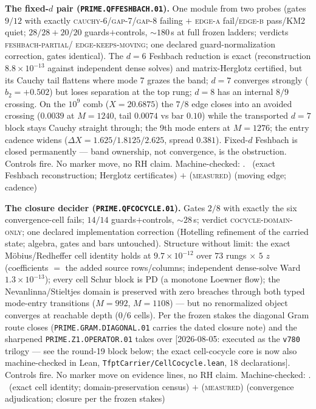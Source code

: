 \documentclass[11pt,a4paper]{article}
\theoremstyle{definition}
\begin{document}
\par\smallskip\noindent\textbf{The fixed-$d$ pair
(\texttt{PRIME.QFFESHBACH.01}).}
One module from two probes (gates $9/12$ with exactly
\textsc{cauchy-6}/\textsc{gap-7}/\textsc{gap-8} failing $+$
\textsc{edge-a} fail/\textsc{edge-b} pass/KM2 quiet;
$28/28+20/20$ guards$+$controls, ${\sim}180$\,s at full frozen
ladders; verdicts \textsc{feshbach-partial}/%
\textsc{edge-keeps-moving}; one declared guard-normalization
correction, gates identical).  The $d=6$ Feshbach reduction is
exact (reconstruction $8.8\times10^{-13}$ against independent
dense solves) and matrix-Herglotz certified, but its Cauchy tail
flattens where mode 7 grazes the band; $d=7$ converges strongly
($b_2=+0.502$) but loses separation at the top rung; $d=8$ has an
internal $8/9$ crossing.  On the $10^{9}$ comb ($X=20.6875$) the
$7/8$ edge closes into an avoided crossing ($0.0039$ at $M=1240$,
tail $0.0074$ vs bar $0.10$) while the transported $d=7$ block
stays Cauchy straight through; the 9th mode enters at $M=1276$;
the entry cadence widens ($\Delta X = 1.625/1.8125/2.625$, spread
$0.381$).  Fixed-$d$ Feshbach is closed permanently --- band
ownership, not convergence, is the obstruction.  Controls fire.
No marker move, no RH claim.
Machine-checked: .
\mE\ (exact Feshbach reconstruction; Herglotz certificates) $+$
(\textsc{measured}) (moving edge; cadence)
\par\smallskip

\par\smallskip\noindent\textbf{The closure decider
(\texttt{PRIME.QFCOCYCLE.01}).}
Gates $2/8$ with exactly the six convergence-cell fails; $14/14$
guards$+$controls, ${\sim}28$\,s; verdict
\textsc{cocycle-domain-only}; one declared implementation
correction (Hotelling refinement of the carried state; algebra,
gates and bars untouched).  Structure without limit: the exact
M\"obius/Redheffer cell identity holds at $9.7\times10^{-12}$ over
$73$ rungs $\times$ $5$ $z$ (coefficients $=$ the added source
rows/columns; independent dense-solve Ward $1.3\times10^{-13}$);
every cell Schur block is PD (a monotone Loewner flow); the
Nevanlinna/Stieltjes domain is preserved with zero breaches
through both typed mode-entry transitions ($M=992$, $M=1108$) ---
but no renormalized object converges at reachable depth ($0/6$
cells).  Per the frozen stakes the diagonal Gram route closes
(\texttt{PRIME.GRAM.DIAGONAL.01} carries the dated closure note)
and the sharpened \texttt{PRIME.Z1.OPERATOR.01} takes over
[2026-08-05: executed as the \texttt{v780} trilogy --- see the
round-19 block below; the exact cell-cocycle core is now also
machine-checked in Lean, \texttt{TfptCarrier/CellCocycle.lean},
18 declarations].
Controls fire.  No marker move on evidence lines, no RH claim.
Machine-checked: .
\mE\ (exact cell identity; domain-preservation census) $+$
(\textsc{measured}) (convergence adjudication; closure per the
frozen stakes)
\par\smallskip
\end{document}
